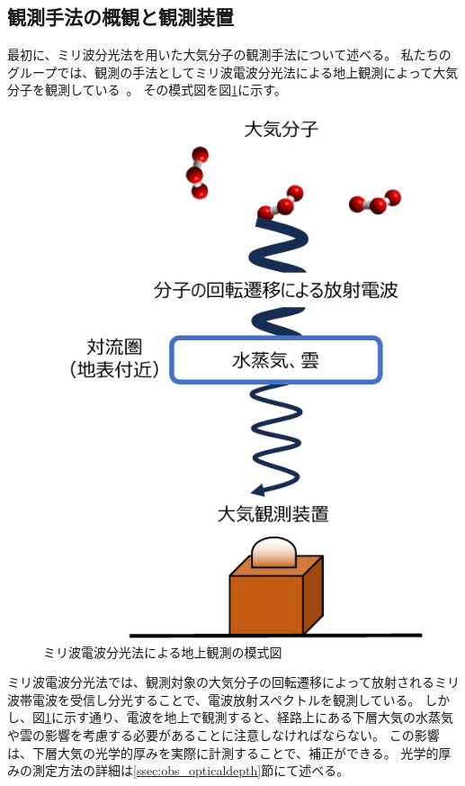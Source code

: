 \subsection{観測手法の概観と観測装置}
\label{ssec:obs_overview}
最初に、ミリ波分光法を用いた大気分子の観測手法について述べる。
私たちのグループでは、観測の手法としてミリ波電波分光法による地上観測によって大気分子を観測している~\cite{mizuno2002millimeter}。
その模式図を図\ref{fig:spectrometer_schema}に示す。
\begin{figure}[htbp]
    \centering
    \includegraphics{master_thesis_contents/master_thesis_fig/spectrometer_schema.pdf}
    \caption{ミリ波電波分光法による地上観測の模式図}
    \label{fig:spectrometer_schema}
\end{figure}
ミリ波電波分光法では、観測対象の大気分子の回転遷移によって放射されるミリ波帯電波を受信し分光することで、電波放射スペクトルを観測している。
しかし、図\ref{fig:spectrometer_schema}に示す通り、電波を地上で観測すると、経路上にある下層大気の水蒸気や雲の影響を考慮する必要があることに注意しなければならない。
この影響は、下層大気の光学的厚みを実際に計測することで、補正ができる。
光学的厚みの測定方法の詳細は\ref{ssec:obs_opticaldepth}節にて述べる。\par

